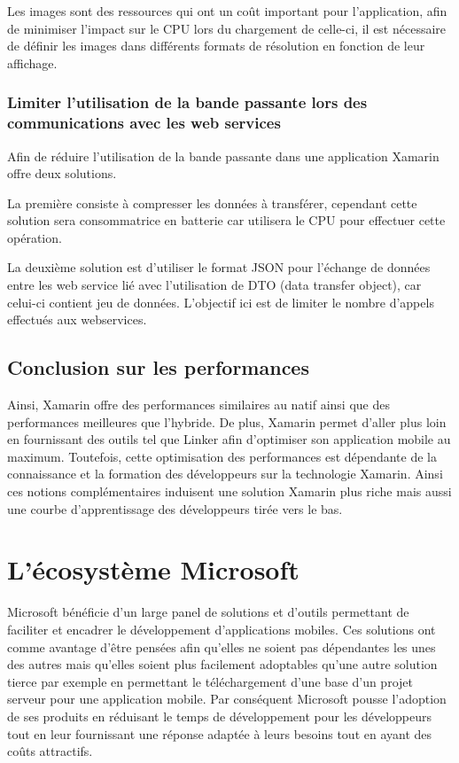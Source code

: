 \documentclass[11]{article}
\begin{document}
Les images sont des ressources qui ont un coût important pour l’application, afin de minimiser l’impact sur le CPU lors du chargement de celle-ci, il est nécessaire de définir les images dans différents formats de résolution en fonction de leur affichage.

\subsubsection{Limiter l’utilisation de la bande passante lors des communications avec les web services}

Afin de réduire l’utilisation de la bande passante dans une application Xamarin offre deux solutions. 
  
\vspace{0.5cm}
   
La première consiste à compresser les données à transférer, cependant cette solution sera consommatrice en batterie car utilisera le CPU pour effectuer cette opération.
  
\vspace{0.5cm}
   
La deuxième solution est d’utiliser le format JSON pour l'échange de données entre les web service lié avec l’utilisation de DTO (data transfer object), car celui-ci contient jeu de données. L’objectif ici est de limiter le nombre d’appels effectués aux webservices.

\subsection{Conclusion sur les performances}

Ainsi, Xamarin offre des performances similaires au natif ainsi que des performances meilleures que l’hybride. De plus, Xamarin permet d’aller plus loin en fournissant des outils tel que Linker afin d’optimiser son application mobile au maximum. Toutefois, cette optimisation des performances est dépendante de la connaissance et la formation des développeurs sur la technologie Xamarin. Ainsi ces notions complémentaires induisent une solution Xamarin plus riche mais aussi une courbe d’apprentissage des développeurs tirée vers le bas.


\section{L’écosystème Microsoft}

Microsoft bénéficie d’un large panel de solutions et d’outils permettant de faciliter et encadrer le développement d’applications mobiles. Ces solutions ont comme avantage d’être pensées afin qu’elles ne soient pas dépendantes les unes des autres mais qu’elles soient plus facilement adoptables qu’une autre solution tierce par exemple en permettant le téléchargement d’une base d’un projet serveur pour une application mobile. Par conséquent Microsoft pousse l’adoption de ses produits en réduisant le temps de développement pour les développeurs tout en leur fournissant une réponse adaptée à leurs besoins tout en ayant des coûts attractifs.
 
\end{document}
